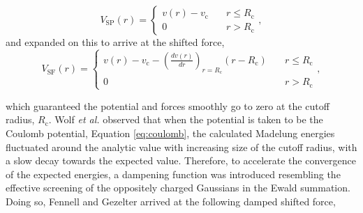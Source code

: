 \begin{equation}
V_\textrm{SP}(r) =      \begin{cases}
v(r)-v_\textrm{c} &\quad r\leqslant R_\textrm{c} \\ 0 &\quad r >
R_\textrm{c}  
\end{cases},
\label{eq:shiftingPotForm}
\end{equation}
and expanded on this to arrive at the shifted force,
\begin{equation}
V_\textrm{SF}(r) =      \begin{cases}
v(r)-v_\textrm{c}-\left(\frac{d v(r)}{d r}\right)_{r=R_\textrm{c}}(r-R_\textrm{c
})
&\quad r\leqslant R_\textrm{c} \\ 0 &\quad r > R_\textrm{c} 
                                                \end{cases},
\label{eq:shiftingForm}
\end{equation}

which guaranteed the potential and forces smoothly go to zero at the
cutoff radius, $R_\textrm{c}$. Wolf \textit{et al.} observed that when
the potential is taken to be the Coulomb potential, Equation
\ref{eq:coulomb}, the calculated Madelung energies fluctuated around
the analytic value with increasing size of the cutoff radius, with a
slow decay towards the expected value.\cite{Wolf1999} Therefore, to
accelerate the convergence of the expected energies, a dampening
function was introduced resembling the effective screening of the
oppositely charged Gaussians in the Ewald summation. Doing so, Fennell
and Gezelter arrived at the following damped shifted force,

